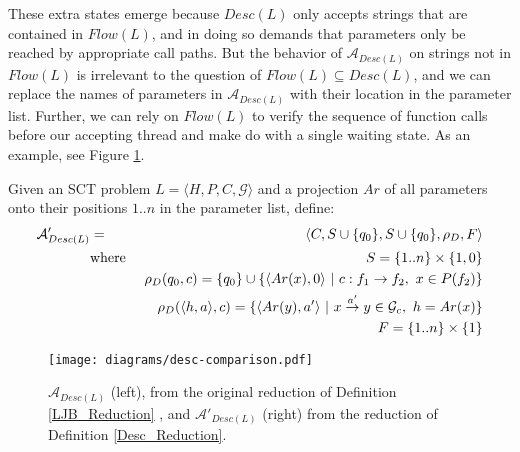 \documentclass{LMCS}
\newcommand{\zug}[1]{\langle #1  \rangle}
\newcommand\vararrow[1]{\stackrel{#1}{\rightarrow}}
\newcommand{\A}{{\mathcal A}}
\newcommand{\G}{{\mathcal G}}
\begin{document}
These extra states emerge because $Desc(L)$ only accepts strings that are contained
in $Flow(L)$, and in doing so demands that parameters only be reached by
appropriate call paths.  But the behavior of $\A_{Desc(L)}$ on strings not in
$Flow(L)$ is irrelevant to the question of $Flow(L) \subseteq Desc(L)$, and we
can replace the names of parameters in $\A_{Desc(L)}$ with their location in the
parameter list.  Further, we can rely on $Flow(L)$ to verify the sequence of
function calls before our accepting thread and make do with a single waiting
state. As an example, see Figure \ref{fig:desc_comp}.

\begin{defi}\label{Desc_Reduction}
Given an SCT problem $L=\zug{H, P, C, \G}$ and a projection $Ar$ of all
parameters onto their positions $1..n$ in the parameter list, define:
\begin{eqnarray*}
\A'_{Desc(L)} &=& \zug{C, S\cup \{q_0\},S \cup \{q_0\},\rho_D,F}\\
&\textnormal{where }& S= \{1..n\} \times \{1, 0\}\\
&&    \rho_D(q_0, c)=\{q_0\} \cup \{\zug{Ar(x),0}~|~c:f_1 \rightarrow f_2,~ x \in P(f_2)\}\\
&&    \rho_D(\zug{h,a},c)=\{\zug{Ar(y),a'}~|~x\vararrow{a'}y\in\G_c,~ h=Ar(x)\}\\
&&    F = \{1..n\} \times \{1\}\\
\end{eqnarray*}
\end{defi}

\begin{figure}[tb]
\begin{center}
{\texttt{[image: diagrams/desc-comparison.pdf]}}
\end{center}
\caption{
$\A_{Desc(L)}$ (left), from the original reduction of Definition \ref{LJB_Reduction} , and 
$\A'_{Desc(L)}$ (right) from the reduction of Definition \ref{Desc_Reduction}. 
} \label{fig:desc_comp}
\end{figure}
\end{document}
